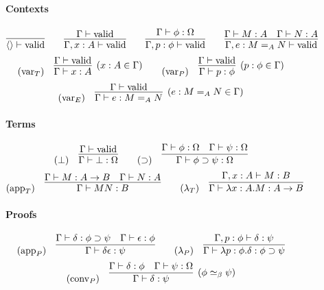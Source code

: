 \documentclass[a4paper,UKenglish]{lipics-v2016}
\newcommand*{\vald}{\ensuremath{\vdash \mathrm{valid}}}
\theoremstyle{plain}
\begin{document}
\newcommand{\RvarT}{\ensuremath(\mathsf{varT})}
\begin{figure}
\paragraph*{Contexts}
\[ \infer{\langle \rangle \vald}{} \qquad
\infer{\Gamma, x : A \vald}{\Gamma \vald} \qquad 
\infer{\Gamma, p : \phi \vald}{\Gamma \vdash \phi : \Omega} \qquad
\infer{\Gamma, e : M =_A N \vald}{\Gamma \vdash M : A \quad \Gamma \vdash N : A} \]
\[ (\mathrm{var}_T) \quad \infer[(x : A \in \Gamma)]{\Gamma \vdash x : A}{\Gamma \vald} \qquad
(\mathrm{var}_P) \quad \infer[(p : \phi \in \Gamma)]{\Gamma \vdash p : \phi}{\Gamma \vald} \]
\[ (\mathrm{var}_E) \quad \infer[(e : M =_A N \in \Gamma)]{\Gamma \vdash e : M =_A N}{\Gamma \vald} \]

\paragraph*{Terms}
\[ (\bot) \quad \infer{\Gamma \vdash \bot : \Omega}{\Gamma \vald} \qquad
(\supset) \quad \infer{\Gamma \vdash \phi \supset \psi : \Omega}{\Gamma \vdash \phi : \Omega \quad \Gamma \vdash \psi : \Omega} \]
\[ (\mathrm{app}_T) \quad \infer{\Gamma \vdash M N : B} {\Gamma \vdash M : A \rightarrow B \quad \Gamma \vdash N : A} \qquad
(\lambda_T) \quad \infer{\Gamma \vdash \lambda x:A.M : A \rightarrow B}{\Gamma, x : A \vdash M : B} \]

\paragraph*{Proofs}
\[ (\mathrm{app}_P) \quad \infer{\Gamma \vdash \delta \epsilon : \psi} {\Gamma \vdash \delta : \phi \supset \psi \quad \Gamma \vdash \epsilon : \phi} \qquad
(\lambda_P) \quad \infer{\Gamma \vdash \lambda p : \phi . \delta : \phi \supset \psi}{\Gamma, p : \phi \vdash \delta : \psi} \]
\[ (\mathrm{conv}_P) \quad \infer[(\phi \simeq_\beta \psi)]{\Gamma \vdash \delta : \psi}{\Gamma \vdash \delta : \phi \quad \Gamma \vdash \psi : \Omega} \]


\end{figure}
\end{document}
